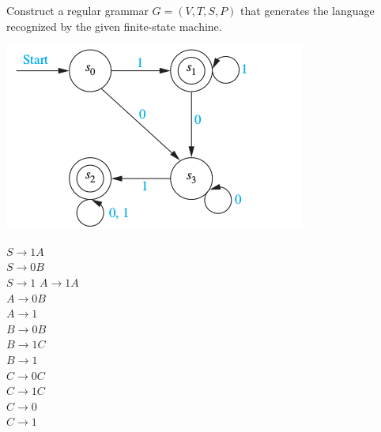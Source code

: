 \documentclass[../main.tex]{subfiles}
\begin{document}
Construct a regular grammar $G = (V, T, S, P)$ that generates the language recognized by the given finite-state machine.

\includegraphics[width=\textwidth]{img/Q13_4_17}
\solution

$S \rightarrow 1A$\\ 
$S \rightarrow 0B$\\
$S \rightarrow 1$
$A \rightarrow 1A$\\
$A \rightarrow 0B$\\
$A \rightarrow 1$\\
$B \rightarrow 0B$\\
$B \rightarrow 1C$\\
$B \rightarrow 1$\\
$C \rightarrow 0C$\\
$C \rightarrow 1C$\\
$C \rightarrow 0$\\
$C \rightarrow 1$
\end{document}
